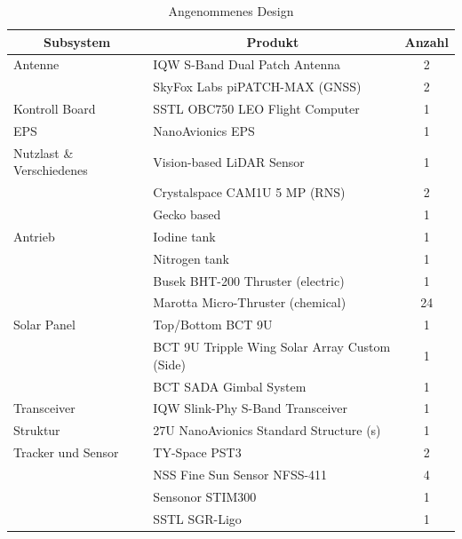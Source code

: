 				\begin{table}[H]
				\centering
\begin{tabular}{|l|l|c|}
\hline
\multicolumn{1}{|c|}{Subsystem} & \multicolumn{1}{c|}{Produkt}    	            & Anzahl \\ \hline
Antenne                         & IQW S-Band Dual Patch Antenna                 & 2      \\ \hline
                                & SkyFox Labs piPATCH-MAX (GNSS)                & 2      \\ \hline
Kontroll Board                  & SSTL OBC750 LEO Flight Computer               & 1      \\ \hline
EPS                             & NanoAvionics EPS                              & 1      \\ \hline
Nutzlast \& Verschiedenes       & Vision-based LiDAR Sensor                     & 1      \\ \hline
                                & Crystalspace CAM1U 5 MP (RNS)                 & 2      \\ \hline
                                & Gecko based                                   & 1      \\ \hline
Antrieb                         & Iodine tank                                   & 1      \\ \hline
                                & Nitrogen tank                                 & 1      \\ \hline
                                & Busek BHT-200 Thruster (electric)             & 1      \\ \hline
                                & Marotta Micro-Thruster (chemical)             & 24     \\ \hline
Solar Panel                     & Top/Bottom BCT 9U                             & 1      \\ \hline
                                & BCT 9U Tripple Wing Solar Array Custom (Side) & 1      \\ \hline
                                & BCT SADA Gimbal System                        & 1      \\ \hline
Transceiver                     & IQW Slink-Phy S-Band Transceiver              & 1      \\ \hline
Struktur                        & 27U NanoAvionics Standard Structure (s)       & 1      \\ \hline
Tracker und Sensor               & TY-Space PST3                                 & 2      \\ \hline
                                & NSS Fine Sun Sensor NFSS-411                  & 4      \\ \hline
                                & Sensonor STIM300                              & 1      \\ \hline
                                & SSTL SGR-Ligo                                 & 1      \\ \hline
\end{tabular}
\caption{Angenommenes Design \cite{Lettau.}}
\label{tab:cubesatdesign}
\end{table}
	
